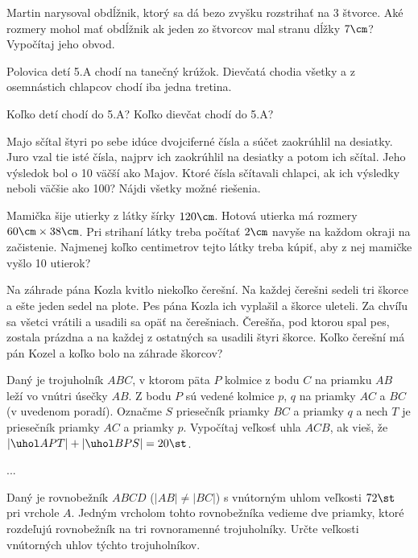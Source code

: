 {%
Martin narysoval obdĺžnik, ktorý sa dá bezo zvyšku rozstrihať na 3 štvorce. Aké rozmery
mohol mať obdĺžnik ak jeden zo štvorcov mal stranu dĺžky $7\cm$? Vypočítaj jeho obvod.}

{%
Polovica detí 5.A chodí na tanečný krúžok. Dievčatá chodia všetky a z osemnástich chlapcov chodí iba jedna tretina.
\begin{itemize}
  Koľko detí chodí do 5.A?
  Koľko dievčat chodí do 5.A?
\end{itemize}
}

{%
Majo sčítal štyri po sebe idúce dvojciferné čísla a súčet zaokrúhlil na desiatky. Juro vzal tie isté čísla, najprv ich zaokrúhlil na desiatky a potom ich sčítal. Jeho výsledok bol o 10 väčší ako Majov. Ktoré čísla sčítavali chlapci, ak ich výsledky neboli väčšie ako 100? Nájdi všetky možné riešenia.}

{%
Mamička šije utierky z látky šírky $120\cm$. Hotová utierka má rozmery $60\cm\times38\cm$. Pri strihaní látky treba počítať $2\cm$ navyše na každom okraji na začistenie. Najmenej koľko centimetrov tejto látky treba kúpiť, aby z nej mamičke vyšlo 10 utierok?}

{%
Na záhrade pána Kozla kvitlo niekoľko čerešní. Na každej čerešni sedeli tri škorce
a ešte jeden sedel na plote. Pes pána Kozla ich vyplašil a škorce uleteli. Za chvíľu sa
všetci vrátili a usadili sa opäť na čerešniach. Čerešňa, pod ktorou spal pes, zostala
prázdna a na každej z ostatných sa usadili štyri škorce. Koľko čerešní má pán Kozel
a koľko bolo na záhrade škorcov?}

{%
Daný je trojuholník $ABC$, v ktorom päta $P$ kolmice z bodu $C$ na priamku $AB$ leží vo
vnútri úsečky $AB$. Z bodu $P$ sú vedené kolmice $p$, $q$ na priamky $AC$ a $BC$
(v uvedenom poradí). Označme $S$ priesečník priamky $BC$ a priamky $q$ a nech $T$ je
priesečník priamky $AC$ a priamky $p$. Vypočítaj veľkosť uhla $ACB$, ak vieš, že
$|\uhol APT|+|\uhol BPS|=20\st$.}

{%
...}

{%
Daný je rovnobežník $ABCD$ ($|AB|\ne|BC|$) s vnútorným uhlom veľkosti $72\st$ pri vrchole
$A$. Jedným vrcholom tohto rovnobežníka vedieme dve priamky, ktoré rozdeľujú
rovnobežník na tri rovnoramenné trojuholníky. Určte veľkosti vnútorných uhlov
týchto trojuholníkov.}

